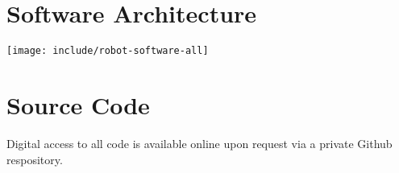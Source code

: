 \documentclass[11pt,twocolumn]{article}
\begin{document}
\appendix
\section{Software Architecture}
\label{sec:robot-software-all}
\begin{figure*}
	\centering
	\texttt{[image: include/robot-software-all]}
	\label{fig:robot-software-all}
\end{figure*}

\section{Source Code}
Digital access to all code is available online upon request via a private
Github respository.

\end{document}
